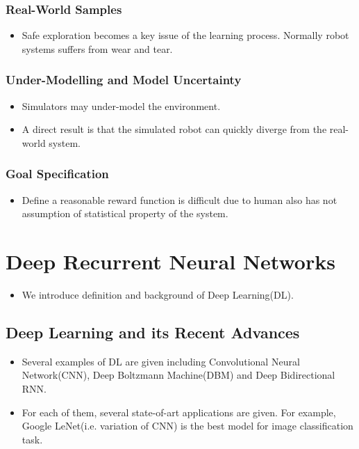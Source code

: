 \documentclass[officiallayout]{tktla}
\begin{document}
\subsection{Real-World Samples}
\begin{itemize}
\item Safe exploration becomes a key issue of the learning process. Normally robot systems suffers from wear and tear.
\end{itemize}

\subsection{Under-Modelling and Model Uncertainty}

\begin{itemize}
\item Simulators may under-model the environment.
\item A direct result is that the simulated robot can quickly diverge from the real-world system.
\end{itemize}

\subsection{Goal Specification}

\begin{itemize}
\item Define a reasonable reward function is difficult due to human also has not assumption of statistical property of the system.
\end{itemize}

\chapter{Deep Recurrent Neural Networks}
\begin{itemize}
\item We introduce definition and background of Deep Learning(DL).
\end{itemize}

\section{Deep Learning and its Recent Advances}
\begin{itemize}
\item Several examples of DL are given including Convolutional Neural Network(CNN), Deep Boltzmann  Machine(DBM) and Deep Bidirectional RNN.
\item For each of them, several state-of-art applications are given. For example, Google LeNet(i.e. variation of CNN) is the best model for image classification task. 
\end{itemize}
\end{document}
